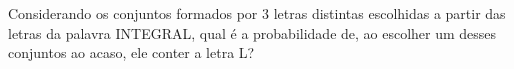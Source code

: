%
%


\begin{exercicioBanco}[\valorquestao]

Considerando os conjuntos formados por 3 letras distintas escolhidas a partir das letras da palavra INTEGRAL, qual é a probabilidade de, ao escolher um desses conjuntos ao acaso, ele conter a letra L?

\end{exercicioBanco}


